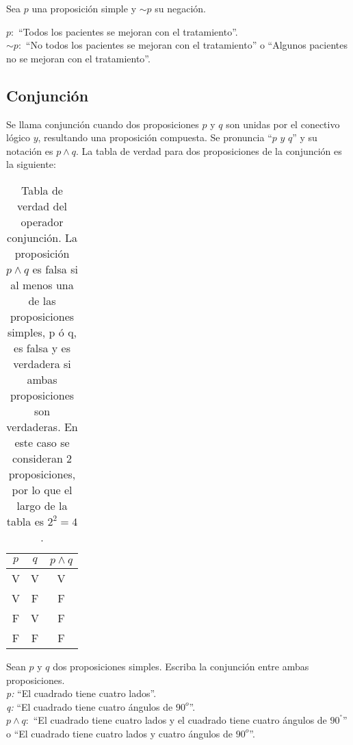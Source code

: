 \begin{myexample}
Sea $p$ una proposición simple y $\sim p$ su negación.
\end{myexample}
\noindent $p:$ ``Todos los pacientes se mejoran con el tratamiento''.\\
$\sim p:$ ``No todos los pacientes se mejoran con el tratamiento'' o ``Algunos pacientes no se mejoran con el tratamiento''. 

\subsection{Conjunción}
Se llama conjunción cuando dos proposiciones $p$ y $q$ son unidas por el conectivo lógico $y$, resultando una proposición compuesta. Se pronuncia ``$p$ $y$ $q$'' y su notación es $p\wedge q$. La tabla de verdad para dos proposiciones de la conjunción es la siguiente:
\begin{table}[h!]
	\begin{center}
		\begin{tabular}{|c|c|c|}
\hline
$p$&$q$&$p\wedge q$\\
\hline
V&V&V\\
\hline
V&F&F\\
\hline
F&V&F\\
\hline
F&F&F\\
\hline
		\end{tabular}
	\end{center}
\caption[Tabla de verdad del operador lógico conjunción.]{Tabla de verdad del operador conjunción. La proposición $p\wedge q$ es falsa si al menos una de las proposiciones simples, p ó q, es falsa y es verdadera si ambas proposiciones son verdaderas. En este caso se consideran 2 proposiciones, por lo que el largo de la tabla es $2^{2}=4$.}
\end{table}

\begin{myexample}
Sean $p$ y $q$ dos proposiciones simples. Escriba la conjunción entre ambas proposiciones.\\

\noindent\textit{p:} ``El cuadrado tiene cuatro lados''.\\
\textit{q:} ``El cuadrado tiene cuatro ángulos de $90^{o}$''.\\
\textit{$p\wedge q:$} ``El cuadrado tiene cuatro lados y el cuadrado tiene cuatro ángulos de $90^{°}$'' o ``El cuadrado tiene cuatro lados y cuatro ángulos de $90^{o}$''.
\end{myexample}


